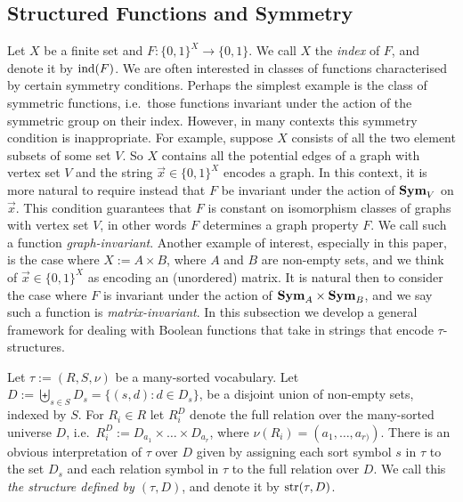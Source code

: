\documentclass[../paper.tex]{subfiles}
\begin{document}


\subsection{Structured Functions and Symmetry}
Let $X$ be a finite set and $F: \{0,1\}^{X} \rightarrow \{0,1\}$. We call $X$
the \emph{index} of $F$, and denote it by $\text{\upshape ind}(F)$. We are often interested in
classes of functions characterised by certain symmetry conditions. Perhaps the
simplest example is the class of symmetric functions, i.e.\ those functions
invariant under the action of the symmetric group on their index. However, in
many contexts this symmetry condition is inappropriate. For example, suppose $X$
consists of all the two element subsets of some set $V$. So $X$ contains all the
potential edges of a graph with vertex set $V$ and the string $ \vec{x} \in
\{0,1\}^X$ encodes a graph. In this context, it is more natural to require
instead that $F$ be invariant under the action of $\text{\textbf{Sym}}_V$ on $\vec{x}$. This
condition guarantees that $F$ is constant on isomorphism classes of graphs with
vertex set $V$, in other words $F$ determines a graph property $F$. We call such
a function \emph{graph-invariant}. Another example of interest, especially in
this paper, is the case where $X := A \times B$, where $A$ and $B$ are non-empty
sets, and we think of $\vec{x} \in \{0,1\}^X$ as encoding an (unordered) matrix.
It is natural then to consider the case where $F$ is invariant under the action
of $\text{\textbf{Sym}}_A \times \text{\textbf{Sym}}_B$, and we say such a function is
\emph{matrix-invariant}. In this subsection we develop a general framework for
dealing with Boolean functions that take in strings that encode
$\tau$-structures.

Let $\tau := (R, S, \nu)$ be a many-sorted vocabulary. Let $D := \biguplus_{s
  \in S} D_{s} = \{(s,d) : d \in D_s\}$, be a disjoint union of non-empty sets,
indexed by $S$. For $R_i \in R$ let $R^D_i$ denote the full relation over the
many-sorted universe $D$, i.e.\ $R^D_i := D_{a_1} \times \ldots \times
D_{a_{r}}$, where $\nu(R_i) = (a_1, \ldots , a_{r)})$. There is an obvious
interpretation of $\tau$ over $D$ given by assigning each sort symbol $s$ in
$\tau$ to the set $D_s$ and each relation symbol in $\tau$ to the full
relation over $D$. We call this \emph{the structure defined by $(\tau, D)$}, and
denote it by $\text{str}(\tau, D)$.
\end{document}
